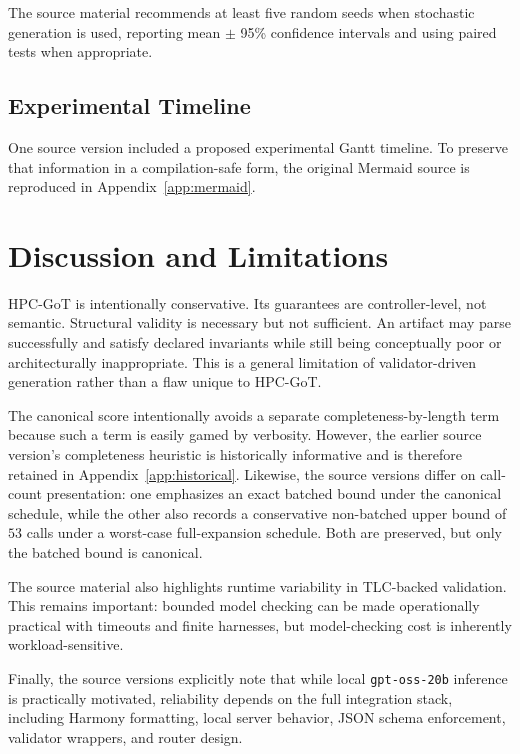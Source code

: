 \documentclass[11pt,a4paper]{article}
\numberwithin{equation}{section}
\theoremstyle{definition}
\begin{document}
The source material recommends at least five random seeds when stochastic generation is used, reporting mean \(\pm\) 95\% confidence intervals and using paired tests when appropriate.

\subsection{Experimental Timeline}

One source version included a proposed experimental Gantt timeline. To preserve that information in a compilation-safe form, the original Mermaid source is reproduced in Appendix~\ref{app:mermaid}.

\section{Discussion and Limitations}

HPC-GoT is intentionally conservative. Its guarantees are controller-level, not semantic. Structural validity is necessary but not sufficient. An artifact may parse successfully and satisfy declared invariants while still being conceptually poor or architecturally inappropriate. This is a general limitation of validator-driven generation rather than a flaw unique to HPC-GoT.

The canonical score intentionally avoids a separate completeness-by-length term because such a term is easily gamed by verbosity. However, the earlier source version's completeness heuristic is historically informative and is therefore retained in Appendix~\ref{app:historical}. Likewise, the source versions differ on call-count presentation: one emphasizes an exact batched bound under the canonical schedule, while the other also records a conservative non-batched upper bound of \(53\) calls under a worst-case full-expansion schedule. Both are preserved, but only the batched bound is canonical.

The source material also highlights runtime variability in TLC-backed validation. This remains important: bounded model checking can be made operationally practical with timeouts and finite harnesses, but model-checking cost is inherently workload-sensitive.

Finally, the source versions explicitly note that while local \texttt{gpt-oss-20b} inference is practically motivated, reliability depends on the full integration stack, including Harmony formatting, local server behavior, JSON schema enforcement, validator wrappers, and router design.
\end{document}
